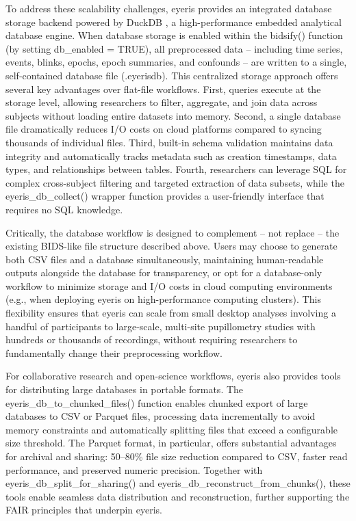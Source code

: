 To address these scalability challenges, eyeris provides an integrated database storage backend powered by DuckDB \parencite{raasveldt2019duckdb}, a high-performance embedded analytical database engine. When database storage is enabled within the bidsify() function (by setting db\_enabled = TRUE), all preprocessed data – including time series, events, blinks, epochs, epoch summaries, and confounds – are written to a single, self-contained database file (.eyerisdb). This centralized storage approach offers several key advantages over flat-file workflows. First, queries execute at the storage level, allowing researchers to filter, aggregate, and join data across subjects without loading entire datasets into memory. Second, a single database file dramatically reduces I/O costs on cloud platforms compared to syncing thousands of individual files. Third, built-in schema validation maintains data integrity and automatically tracks metadata such as creation timestamps, data types, and relationships between tables. Fourth, researchers can leverage SQL for complex cross-subject filtering and targeted extraction of data subsets, while the eyeris\_db\_collect() wrapper function provides a user-friendly interface that requires no SQL knowledge.

Critically, the database workflow is designed to complement – not replace – the existing BIDS-like file structure described above. Users may choose to generate both CSV files and a database simultaneously, maintaining human-readable outputs alongside the database for transparency, or opt for a database-only workflow to minimize storage and I/O costs in cloud computing environments (e.g., when deploying eyeris on high-performance computing clusters). This flexibility ensures that eyeris can scale from small desktop analyses involving a handful of participants to large-scale, multi-site pupillometry studies with hundreds or thousands of recordings, without requiring researchers to fundamentally change their preprocessing workflow.

For collaborative research and open-science workflows, eyeris also provides tools for distributing large databases in portable formats. The eyeris\_db\_to\_chunked\_files() function enables chunked export of large databases to CSV or Parquet files, processing data incrementally to avoid memory constraints and automatically splitting files that exceed a configurable size threshold. The Parquet format, in particular, offers substantial advantages for archival and sharing: 50–80\% file size reduction compared to CSV, faster read performance, and preserved numeric precision. Together with eyeris\_db\_split\_for\_sharing() and eyeris\_db\_reconstruct\_from\_chunks(), these tools enable seamless data distribution and reconstruction, further supporting the FAIR principles that underpin eyeris.

